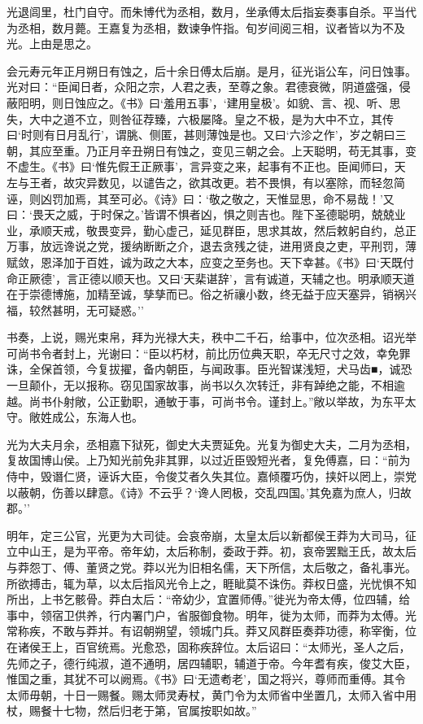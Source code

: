\documentclass[]{article}
\begin{document}
光退闾里，杜门自守。而朱博代为丞相，数月，坐承傅太后指妄奏事自杀。平当代为丞相，数月薨。王嘉复为丞相，数谏争忤指。旬岁间阅三相，议者皆以为不及光。上由是思之。

会元寿元年正月朔日有蚀之，后十余日傅太后崩。是月，征光诣公车，问日蚀事。光对曰：``臣闻日者，众阳之宗，人君之表，至尊之象。君德衰微，阴道盛强，侵蔽阳明，则日蚀应之。《书》曰`羞用五事'，`建用皇极'。如貌、言、视、听、思失，大中之道不立，则咎征荐臻，六极屡降。皇之不极，是为大中不立，其传曰`时则有日月乱行'，谓朓、侧匿，甚则薄蚀是也。又曰`六沴之作'，岁之朝曰三朝，其应至重。乃正月辛丑朔日有蚀之，变见三朝之会。上天聪明，苟无其事，变不虚生。《书》曰`惟先假王正厥事'，言异变之来，起事有不正也。臣闻师曰，天左与王者，故灾异数见，以谴告之，欲其改更。若不畏惧，有以塞除，而轻忽简诬，则凶罚加焉，其至可必。《诗》曰：`敬之敬之，天惟显思，命不易哉！'又曰：`畏天之威，于时保之。'皆谓不惧者凶，惧之则吉也。陛下圣德聪明，兢兢业业，承顺天戒，敬畏变异，勤心虚己，延见群臣，思求其故，然后敕躬自约，总正万事，放远谗说之党，援纳断断之介，退去贪残之徒，进用贤良之吏，平刑罚，薄赋敛，恩泽加于百姓，诚为政之大本，应变之至务也。天下幸甚。《书》曰`天既付命正厥德'，言正德以顺天也。又曰`天棐谌辞'，言有诚道，天辅之也。明承顺天道在于崇德博施，加精至诚，孳孳而已。俗之祈禳小数，终无益于应天塞异，销祸兴福，较然甚明，无可疑惑。''

书奏，上说，赐光束帛，拜为光禄大夫，秩中二千石，给事中，位次丞相。诏光举可尚书令者封上，光谢曰：``臣以朽材，前比历位典天职，卒无尺寸之效，幸免罪诛，全保首领，今复拔擢，备内朝臣，与闻政事。臣光智谋浅短，犬马齿■，诚恐一旦颠仆，无以报称。窃见国家故事，尚书以久次转迁，非有踔绝之能，不相逾越。尚书仆射敞，公正勤职，通敏于事，可尚书令。谨封上。''敞以举故，为东平太守。敞姓成公，东海人也。

光为大夫月余，丞相嘉下狱死，御史大夫贾延免。光复为御史大夫，二月为丞相，复故国博山侯。上乃知光前免非其罪，以过近臣毁短光者，复免傅嘉，曰：``前为侍中，毁谮仁贤，诬诉大臣，令俊艾者久失其位。嘉倾覆巧伪，挟奸以罔上，崇党以蔽朝，伤善以肆意。《诗》不云乎？`谗人罔极，交乱四国。'其免嘉为庶人，归故郡。''

明年，定三公官，光更为大司徒。会哀帝崩，太皇太后以新都侯王莽为大司马，征立中山王，是为平帝。帝年幼，太后称制，委政于莽。初，哀帝罢黜王氏，故太后与莽怨丁、傅、董贤之党。莽以光为旧相名儒，天下所信，太后敬之，备礼事光。所欲搏击，辄为草，以太后指风光令上之，睚眦莫不诛伤。莽权日盛，光忧惧不知所出，上书乞骸骨。莽白太后：``帝幼少，宜置师傅。''徙光为帝太傅，位四辅，给事中，领宿卫供养，行内署门户，省服御食物。明年，徙为太师，而莽为太傅。光常称疾，不敢与莽并。有诏朝朔望，领城门兵。莽又风群臣奏莽功德，称宰衡，位在诸侯王上，百官统焉。光愈恐，固称疾辞位。太后诏曰：``太师光，圣人之后，先师之子，德行纯淑，道不通明，居四辅职，辅道于帝。今年耆有疾，俊艾大臣，惟国之重，其犹不可以阙焉。《书》曰`无遗耇老'，国之将兴，尊师而重傅。其令太师毋朝，十日一赐餐。赐太师灵寿杖，黄门令为太师省中坐置几，太师入省中用杖，赐餐十七物，然后归老于第，官属按职如故。''
\end{document}
